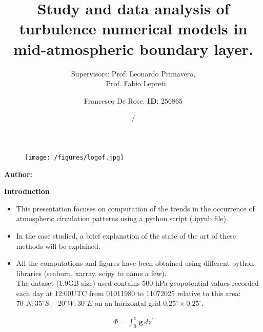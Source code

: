 \documentclass[9pt]{beamer}
\title[University of Calabria]{Study and data analysis of turbulence numerical models in mid-atmospheric boundary layer.}
\subtitle{Supervisors: Prof. Leonardo Primavera,\\ \quad \quad \quad \quad \quad \, \, Prof. Fabio Lepreti.}
\author[Name Surname]{ Francesco De Rose. \textbf{ID}: 256865}
\institute[]{University of Calabria, Physics department, Rende (CS)}
\date{\currentyear/\nextyear} %
\newcommand\Fonttab{\fontsize{12}{7.2}\selectfont}
\begin{document}
\begin{frame}{}
\vspace{\fill}


\begin{figure}[htbp] %
\texttt{[image: /figures/logof.jpg]} 
\end{figure}

\vspace{\fill}

\Large
\color{main}
\inserttitle

\medskip

\large
\color{black}
\insertsubtitle

\vspace{\fill}

\footnotesize
\insertinstitute

\vspace{\fill}

\textbf{Author:} \insertauthor

\medskip

\insertdate

\vspace{\fill}
\end{frame}

\begin{frame}[allowframebreaks]{\textbf{Introduction}}
\Fonttab
\begin{itemize}

\item This presentation focuses on computation of the trends in the occurrence of atmospheric circulation patterns using a python script (.ipynb file).
\item In the case studied, a brief explanation of the state of the art of these methods will be explained.
\item All the computations and figures have been obtained using different python libraries (seaborn, xarray, scipy to name a few). \\The dataset (1.9GB size) used contains 500 hPa geopotential values recorded each day at 12:00UTC  from 01011980 to 11072025 relative to this area: 
$70^\circ N:35^\circ S; -20^\circ W:30^\circ E$ on an horizontal grid $0.25^\circ \times 0.25^\circ$.  
\end{itemize}
\begin{eqnarray}
\boxed{\Phi  = \int_{0}^{z}\, \mathbf{g}\, dz^{\prime} }
\end{eqnarray}
\end{frame}
\end{document}
